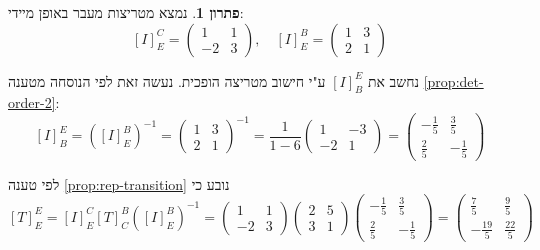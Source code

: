 \documentclass[12pt]{report}
\theoremstyle{plain}
\theoremstyle{definition}
\newtheorem*{solution}{פתרון}
\newcommand{\0}{\mathbf{0}}
\begin{document}
\begin{solution}
נמצא מטריצות מעבר באופן מיידי:
$$
[I]_E^C=\begin{pmatrix}
1 & 1 \\
-2 & 3
\end{pmatrix},\quad [I]_E^B=\begin{pmatrix}
1 & 3 \\
2 & 1
\end{pmatrix}
$$

נחשב את
$[I]_B^E$
ע"י חישוב מטריצה הופכית. נעשה זאת לפי הנוסחה מטענה
\ref{prop:det-order-2}:
$$
[I]_B^E=([I]_E^B)^{-1}=\begin{pmatrix}
1 & 3 \\
2 & 1
\end{pmatrix}^{-1}=\frac{1}{1-6}\begin{pmatrix}
1 & -3 \\
-2 & 1
\end{pmatrix}=\begin{pmatrix}
-\frac{1}{5} & \frac{3}{5} \\
\frac{2}{5} & -\frac{1}{5}
\end{pmatrix}
$$

לפי טענה
\ref{prop:rep-transition}
נובע כי
$$
[T]_E^E=[I]_{E}^C[T]_C^B([I]_E^B)^{-1}=\begin{pmatrix}
1 & 1 \\
-2 & 3
\end{pmatrix}\begin{pmatrix}
2 & 5 \\
3 & 1
\end{pmatrix}\begin{pmatrix}
-\frac{1}{5} & \frac{3}{5} \\
\frac{2}{5} & -\frac{1}{5}
\end{pmatrix}=\begin{pmatrix}
\frac{7}{5} & \frac{9}{5} \\
-\frac{19}{5} & \frac{22}{5}
\end{pmatrix}
$$


\end{solution}
\end{document}
